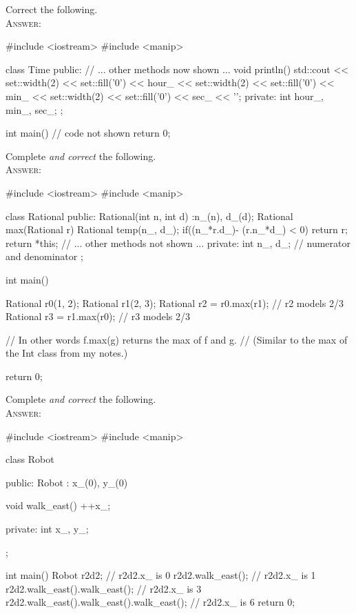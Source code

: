 

\renewcommand\AUTHOR{cadalebout1@cougars.ccis.edu} %


\topmattertwo

\nextq
Correct the following.
\\
\textsc{Answer:}\vspace{-2mm}
\begin{answercode}
#include <iostream>
#include <manip>

class Time
{
public:
    // ... other methods now shown ...
    void println()
    {
        std::cout << set::width(2) << set::fill('0') << hour_
                  << set::width(2) << set::fill('0') << min_
                  << set::width(2) << set::fill('0') << sec_ << '\n';
    }
private:
    int hour_, min_, sec_;
};

int main()
{
    // code not shown
    return 0;
}
\end{answercode}

\nextq
Complete \textit{and correct} the following.
\\
\textsc{Answer:}\vspace{-2mm}
\begin{answercode}
#include <iostream>
#include <manip>

class Rational
{
public:
    Rational(int n, int d)
    :n_(n), d_(d);
    {}
    Rational max(Rational r)
    {
        Rational temp(n_, d_);
        if((n_*r.d_)- (r.n_*d_) < 0)
        {
                return r;
        }
        return *this;
    }
    // ... other methods not shown ...
private:
    int n_, d_; // numerator and denominator
};

int main()
{
    Rational r0(1, 2);
    Rational r1(2, 3);
    Rational r2 = r0.max(r1); // r2 models 2/3
    Rational r3 = r1.max(r0); // r3 models 2/3

    // In other words f.max(g) returns the max of f and g.
    // (Similar to the max of the Int class from my notes.)
    
    return 0;
}
\end{answercode}

\nextq
Complete \textit{and correct} the following.
\\
\textsc{Answer:}\vspace{-2mm}
\begin{answercode}
#include <iostream>
#include <manip>

class Robot
{
public:
    Robot
        : x_(0), y_(0)
    {}
    
    void walk_east()
    {
        ++x_;
    }
    
private:
    int x_, y_;
};

int main()
{
    Robot r2d2;                               // r2d2.x_ is 0
    r2d2.walk_east();                         // r2d2.x_ is 1
    r2d2.walk_east().walk_east();             // r2d2.x_ is 3
    r2d2.walk_east().walk_east().walk_east(); // r2d2.x_ is 6
    return 0;
}
\end{answercode}

\newpage


